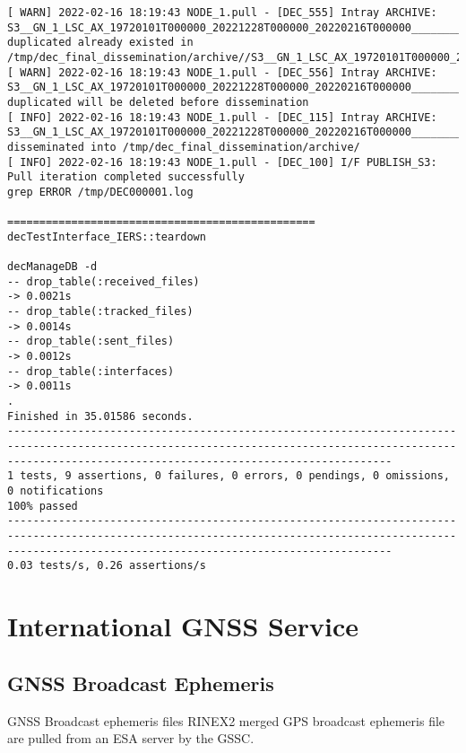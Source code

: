 \documentclass[dec_sum_main.tex]{subfiles}
\begin{document}
\begin{Verbatim}[fontsize=\tiny]
[ WARN] 2022-02-16 18:19:43 NODE_1.pull - [DEC_555] Intray ARCHIVE: S3__GN_1_LSC_AX_19720101T000000_20221228T000000_20220216T000000_____________________USN_O_NR_POD.SEN3 duplicated already existed in /tmp/dec_final_dissemination/archive//S3__GN_1_LSC_AX_19720101T000000_20221228T000000_20220216T000000_____________________USN_O_NR_POD.SEN3
[ WARN] 2022-02-16 18:19:43 NODE_1.pull - [DEC_556] Intray ARCHIVE: S3__GN_1_LSC_AX_19720101T000000_20221228T000000_20220216T000000_____________________USN_O_NR_POD.SEN3 duplicated will be deleted before dissemination
[ INFO] 2022-02-16 18:19:43 NODE_1.pull - [DEC_115] Intray ARCHIVE: S3__GN_1_LSC_AX_19720101T000000_20221228T000000_20220216T000000_____________________USN_O_NR_POD.SEN3 disseminated into /tmp/dec_final_dissemination/archive/
[ INFO] 2022-02-16 18:19:43 NODE_1.pull - [DEC_100] I/F PUBLISH_S3: Pull iteration completed successfully
grep ERROR /tmp/DEC000001.log

================================================
decTestInterface_IERS::teardown

decManageDB -d
-- drop_table(:received_files)
-> 0.0021s
-- drop_table(:tracked_files)
-> 0.0014s
-- drop_table(:sent_files)
-> 0.0012s
-- drop_table(:interfaces)
-> 0.0011s
.
Finished in 35.01586 seconds.
--------------------------------------------------------------------------------------------------------------------------------------------------------------------------------------------------------
1 tests, 9 assertions, 0 failures, 0 errors, 0 pendings, 0 omissions, 0 notifications
100% passed
--------------------------------------------------------------------------------------------------------------------------------------------------------------------------------------------------------
0.03 tests/s, 0.26 assertions/s

\end{Verbatim}

\pagebreak

\section{International GNSS Service}

\subsection{GNSS Broadcast Ephemeris}
GNSS Broadcast ephemeris files RINEX2 merged GPS broadcast ephemeris file are pulled from an ESA server by the GSSC.\newline
\end{document}
